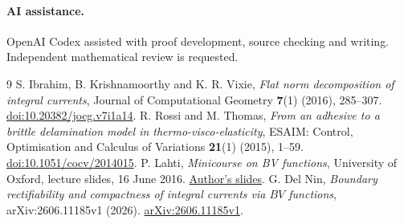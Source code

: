 \documentclass[11pt]{article}
\begin{document}
\paragraph{AI assistance.}
OpenAI Codex assisted with proof development, source checking and writing.
Independent mathematical review is requested.

\begin{thebibliography}{9}
S. Ibrahim, B. Krishnamoorthy and K. R. Vixie,
\emph{Flat norm decomposition of integral currents},
Journal of Computational Geometry \textbf{7}(1) (2016), 285--307.
\href{https://doi.org/10.20382/jocg.v7i1a14}{doi:10.20382/jocg.v7i1a14}.
R. Rossi and M. Thomas,
\emph{From an adhesive to a brittle delamination model in thermo-visco-elasticity},
ESAIM: Control, Optimisation and Calculus of Variations \textbf{21}(1)
(2015), 1--59.
\href{https://doi.org/10.1051/cocv/2014015}{doi:10.1051/cocv/2014015}.
P. Lahti, \emph{Minicourse on BV functions},
University of Oxford, lecture slides, 16 June 2016.
\href{https://www.maths.ox.ac.uk/system/files/attachments/BV_minicourse_Slides_Version3_0.pdf}{Author's slides}.
G. Del Nin, \emph{Boundary rectifiability and compactness of integral currents
via $BV$ functions}, arXiv:2606.11185v1 (2026).
\href{https://arxiv.org/abs/2606.11185v1}{arXiv:2606.11185v1}.
\end{thebibliography}
\end{document}
